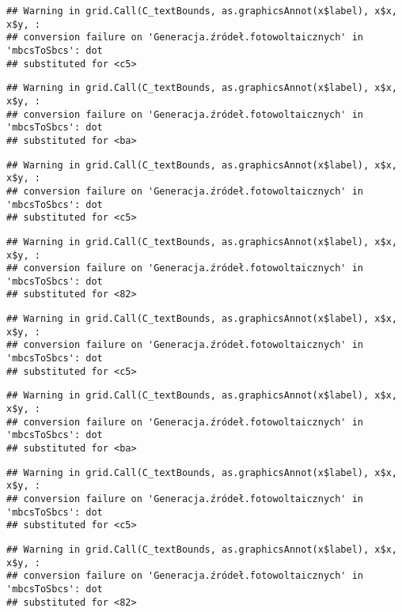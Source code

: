 \documentclass[
]{article}
\begin{document}
\begin{verbatim}
## Warning in grid.Call(C_textBounds, as.graphicsAnnot(x$label), x$x, x$y, :
## conversion failure on 'Generacja.źródeł.fotowoltaicznych' in 'mbcsToSbcs': dot
## substituted for <c5>
\end{verbatim}

\begin{verbatim}
## Warning in grid.Call(C_textBounds, as.graphicsAnnot(x$label), x$x, x$y, :
## conversion failure on 'Generacja.źródeł.fotowoltaicznych' in 'mbcsToSbcs': dot
## substituted for <ba>
\end{verbatim}

\begin{verbatim}
## Warning in grid.Call(C_textBounds, as.graphicsAnnot(x$label), x$x, x$y, :
## conversion failure on 'Generacja.źródeł.fotowoltaicznych' in 'mbcsToSbcs': dot
## substituted for <c5>
\end{verbatim}

\begin{verbatim}
## Warning in grid.Call(C_textBounds, as.graphicsAnnot(x$label), x$x, x$y, :
## conversion failure on 'Generacja.źródeł.fotowoltaicznych' in 'mbcsToSbcs': dot
## substituted for <82>
\end{verbatim}

\begin{verbatim}
## Warning in grid.Call(C_textBounds, as.graphicsAnnot(x$label), x$x, x$y, :
## conversion failure on 'Generacja.źródeł.fotowoltaicznych' in 'mbcsToSbcs': dot
## substituted for <c5>
\end{verbatim}

\begin{verbatim}
## Warning in grid.Call(C_textBounds, as.graphicsAnnot(x$label), x$x, x$y, :
## conversion failure on 'Generacja.źródeł.fotowoltaicznych' in 'mbcsToSbcs': dot
## substituted for <ba>
\end{verbatim}

\begin{verbatim}
## Warning in grid.Call(C_textBounds, as.graphicsAnnot(x$label), x$x, x$y, :
## conversion failure on 'Generacja.źródeł.fotowoltaicznych' in 'mbcsToSbcs': dot
## substituted for <c5>
\end{verbatim}

\begin{verbatim}
## Warning in grid.Call(C_textBounds, as.graphicsAnnot(x$label), x$x, x$y, :
## conversion failure on 'Generacja.źródeł.fotowoltaicznych' in 'mbcsToSbcs': dot
## substituted for <82>
\end{verbatim}
\end{document}
